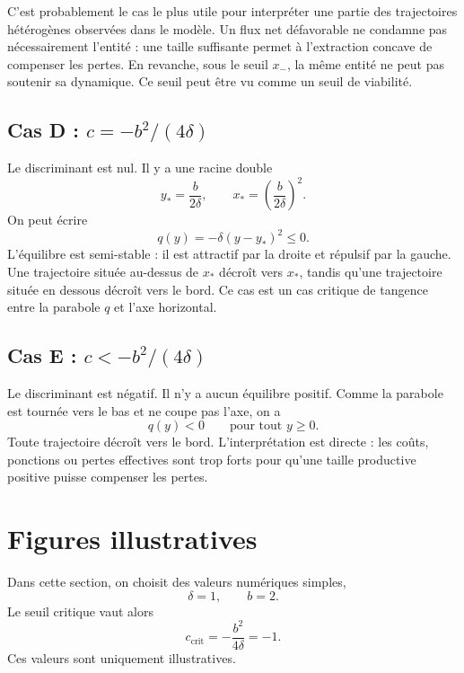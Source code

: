 \documentclass[11pt,a4paper]{article}
\begin{document}
C'est probablement le cas le plus utile pour interpréter une partie des trajectoires hétérogènes observées dans le modèle. Un flux net défavorable ne condamne pas nécessairement l'entité : une taille suffisante permet à l'extraction concave de compenser les pertes. En revanche, sous le seuil \(x_-\), la même entité ne peut pas soutenir sa dynamique. Ce seuil peut être vu comme un seuil de viabilité.

\subsection*{Cas D : \(c=-b^2/(4\delta)\)}

Le discriminant est nul. Il y a une racine double
\[
    y_*=\frac{b}{2\delta},
    \qquad
    x_*=\left(\frac{b}{2\delta}\right)^2.
\]
On peut écrire
\[
    q(y)=-\delta (y-y_*)^2\leq 0.
\]
L'équilibre est semi-stable : il est attractif par la droite et répulsif par la gauche. Une trajectoire située au-dessus de \(x_*\) décroît vers \(x_*\), tandis qu'une trajectoire située en dessous décroît vers le bord. Ce cas est un cas critique de tangence entre la parabole \(q\) et l'axe horizontal.

\subsection*{Cas E : \(c<-b^2/(4\delta)\)}

Le discriminant est négatif. Il n'y a aucun équilibre positif. Comme la parabole est tournée vers le bas et ne coupe pas l'axe, on a
\[
    q(y)<0\qquad \text{pour tout } y\geq 0.
\]
Toute trajectoire décroît vers le bord. L'interprétation est directe : les coûts, ponctions ou pertes effectives sont trop forts pour qu'une taille productive positive puisse compenser les pertes.

\section{Figures illustratives}

Dans cette section, on choisit des valeurs numériques simples,
\[
    \delta=1,\qquad b=2.
\]
Le seuil critique vaut alors
\[
    c_{\mathrm{crit}}=-\frac{b^2}{4\delta}=-1.
\]
Ces valeurs sont uniquement illustratives.
\end{document}
